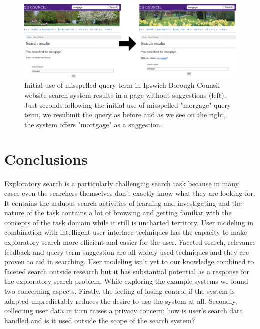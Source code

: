 \documentclass{sigchi}
\begin{document}
\begin{figure}[htp] %
\caption{Initial use of misspelled query term in Ipswich Borough Counsil website search system results in a page without suggestions (left).
Just seconds following the initial use of misspelled "morgage" query term, we resubmit the query as before and as we see on the right, the system offers "mortgage" as a suggestion.
\protect} \label{figure_queryExpansion3}
\centering
\includegraphics[scale=0.41]{figures/queryExpansion3.pdf} 
\end{figure}



\section{Conclusions}
Exploratory search is a particularly challenging search task because in many cases even the searchers themselves don't exactly know what they are looking for.
It contains the arduous search activities of learning and investigating and the nature of the task contains a lot of browsing and getting familiar with the concepts of the task domain while it still is uncharted territory.
User modeling in combination with intelligent user interface techniques has the capacity to make exploratory search more efficient and easier for the user.
Faceted search, relevance feedback and query term suggestion are all widely used techniques and they are proven to aid in searching.
User modeling isn't yet to our knowledge combined to faceted search outside research but it has substantial potential as a response for the exploratory search problem.
While exploring the example systems we found two concerning aspects.
Firstly, the feeling of losing control if the system is adapted unpredictably reduces the desire to use the system at all.
Secondly, collecting user data in turn raises a privacy concern; how is user's search data handled and is it used outside the scope of the search system?
\end{document}
